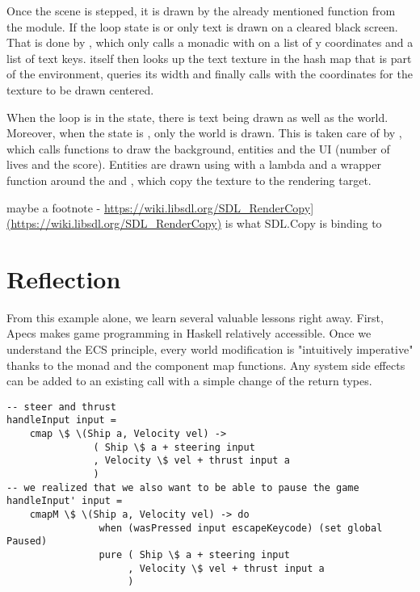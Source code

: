 \documentclass[
  digital, %
  table,   %
  twoside, %
  lof,     %
  lot,     %
]{fithesis3}
\begin{document}
Once the scene is stepped, it is drawn by the already mentioned 
function from the  module. If the loop state is  or
 only text is drawn on a cleared black screen. That is done by
, which only calls a monadic  with
 on a list of y coordinates and a list of text keys.
 itself then looks up the text texture in the
hash map that is part of the  environment,
queries its width and finally calls  with the coordinates
for the texture to be drawn centered.

When the loop is in the  state, there is text being drawn
as well as the world. Moreover, when the state is ,
only the world is drawn. This is taken care of by ,
which calls functions to draw the background, entities and the UI
(number of lives and the score). Entities are drawn using 
with a lambda and a wrapper function around the  and
, which copy the texture to the rendering target.

maybe a footnote - \url{https://wiki.libsdl.org/SDL_RenderCopy](https://wiki.libsdl.org/SDL_RenderCopy)}
is what SDL.Copy is binding to



\section{Reflection}
From this example alone, we learn several valuable lessons right away.
First, Apecs makes game programming in Haskell relatively accessible.
Once we understand the ECS principle, every world modification is
"intuitively imperative" thanks to the  monad and
the component map functions. Any system side effects can be added
to an existing  call with a simple change of the return types.
\begin{verbatim}
-- steer and thrust
handleInput input =
    cmap \$ \(Ship a, Velocity vel) ->
               ( Ship \$ a + steering input
               , Velocity \$ vel + thrust input a
               )
-- we realized that we also want to be able to pause the game
handleInput' input =
    cmapM \$ \(Ship a, Velocity vel) -> do
                when (wasPressed input escapeKeycode) (set global Paused)
                pure ( Ship \$ a + steering input
                     , Velocity \$ vel + thrust input a
                     )
\end{verbatim}
\end{document}
